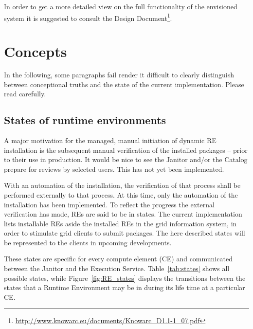 In order to get a more detailed view on the full functionality of the envisioned system it is suggested to consult the 
Design Document\footnote{\href{http://www.knowarc.eu/documents/Knowarc_D1.1-1_07.pdf}
{http://www.knowarc.eu/documents/Knowarc\_D1.1-1\_07.pdf}}.

\section{Concepts}

In the following, some paragraphs fail render it difficult to 
clearly distinguish between conceptional truths and the state
of the current implementation. Please read carefully.

\subsection{States of runtime environments}

A major motivation for the managed, manual initiation of dynamic RE
installation is the subsequent manual verification of the installed
packages -- prior to their use in production. It would be nice to
see the Janitor and/or the Catalog prepare for reviews by selected
users. This has not yet been implemented.

With an automation of the installation, the verification of
that process shall be performed externally to that process.  At this
time, only the automation of the installation has been implemented.
To reflect the progress the external verification has made, REs
are said to be in states. The current implementation lists
installable REs aside the installed REs in the grid information system,
in order to stimulate grid clients to submit packages. The here described
states will be represented to the clients in upcoming developments.

These states are specific for every compute element (CE) and communicated
between the Janitor and the Execution Service. Table~\ref{tab:states} shows all
possible states, while Figure~\ref{fig:RE_states}
displays the transitions between the states that a Runtime Environment may
be in during its life time at a particular CE.   



